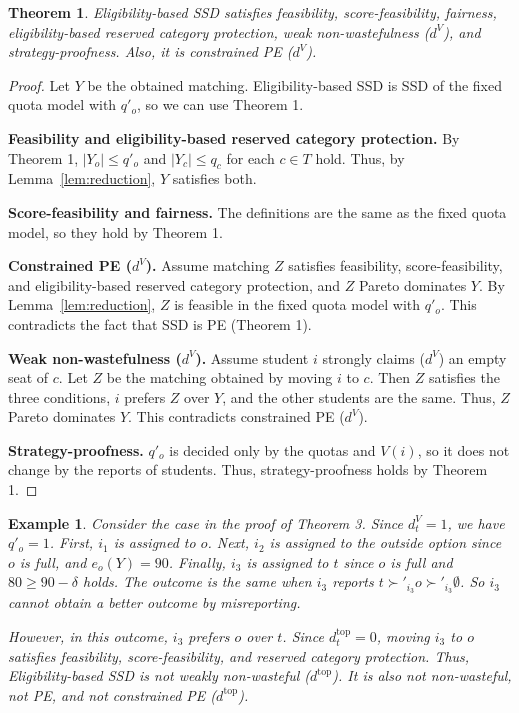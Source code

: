 \documentclass{article}
\newtheorem{example}{Example}
\newtheorem{theorem}{Theorem}
\begin{document}
\begin{theorem}
Eligibility-based SSD satisfies feasibility, score-feasibility, fairness,
eligibility-based reserved category protection, weak non-wastefulness ($d^V$),
and strategy-proofness. Also, it is constrained PE ($d^V$).
\end{theorem}
\begin{proof}
Let $Y$ be the obtained matching.
Eligibility-based SSD is SSD of the fixed quota model with $q'_o$, so we can use Theorem 1.

\textbf{Feasibility and eligibility-based reserved category protection.}
By Theorem 1, $|Y_o|\le q'_o$ and $|Y_c|\le q_c$ for each $c\in T$ hold.
Thus, by Lemma~\ref{lem:reduction}, $Y$ satisfies both.

\textbf{Score-feasibility and fairness.}
The definitions are the same as the fixed quota model, so they hold by Theorem 1.

\textbf{Constrained PE ($d^V$).}
Assume matching $Z$ satisfies feasibility, score-feasibility, and eligibility-based
reserved category protection, and $Z$ Pareto dominates $Y$.
By Lemma~\ref{lem:reduction}, $Z$ is feasible in the fixed quota model with $q'_o$.
This contradicts the fact that SSD is PE (Theorem 1).

\textbf{Weak non-wastefulness ($d^V$).}
Assume student $i$ strongly claims ($d^V$) an empty seat of $c$.
Let $Z$ be the matching obtained by moving $i$ to $c$.
Then $Z$ satisfies the three conditions, $i$ prefers $Z$ over $Y$, and the other students
are the same. Thus, $Z$ Pareto dominates $Y$.
This contradicts constrained PE ($d^V$).

\textbf{Strategy-proofness.}
$q'_o$ is decided only by the quotas and $V(i)$, so it does not change by the reports of students.
Thus, strategy-proofness holds by Theorem 1.
\end{proof}

\begin{example}
Consider the case in the proof of Theorem 3. Since $d^V_t=1$, we have $q'_o=1$.
First, $i_1$ is assigned to $o$.
Next, $i_2$ is assigned to the outside option since $o$ is full, and $e_o(Y)=90$.
Finally, $i_3$ is assigned to $t$ since $o$ is full and $80\ge 90-\delta$ holds.
The outcome is the same when $i_3$ reports $t\succ'_{i_3}o\succ'_{i_3}\emptyset$.
So $i_3$ cannot obtain a better outcome by misreporting.

However, in this outcome, $i_3$ prefers $o$ over $t$.
Since $d^{\mathrm{top}}_t=0$, moving $i_3$ to $o$ satisfies feasibility,
score-feasibility, and reserved category protection.
Thus, Eligibility-based SSD is not weakly non-wasteful ($d^{\mathrm{top}}$).
It is also not non-wasteful, not PE, and not constrained PE ($d^{\mathrm{top}}$).
\end{example}
\end{document}
